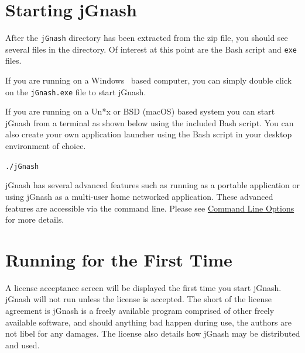 \documentclass[letterpaper,12pt]{book}
\begin{document}
    \section{Starting jGnash}\label{sec:starting-jgnash}

    After the \texttt{jGnash} directory has been extracted from the zip file, you should see several files in the directory.
    Of interest at this point are the Bash script and \texttt{exe} files.

    If you are running on a Windows\texttrademark~ based computer, you can simply double click on the \texttt{jGnash.exe} file to
    start jGnash.

    If you are running on a Un*x or BSD (macOS) based system you can start jGnash from a terminal as shown below using
    the included Bash script.
    You can also create your own application launcher using the Bash script in your desktop environment of choice.


    \begin{mdframed}[style=info]
        \texttt{./jGnash}
    \end{mdframed}

    jGnash has several advanced features such as running as a portable application or using jGnash as a multi-user home
    networked application. These advanced features are accessible via the command line.
    Please see \hyperref[ch:cmdOptions]{Command Line Options} for more details.

    \section{Running for the First Time}\label{sec:running-for-the-first-time}
    A license acceptance screen will be displayed the first time you start jGnash.
    jGnash will not run unless the license is accepted.
    The short of the license agreement is jGnash is a freely available program comprised of other freely available software,
    and should anything bad happen during use, the authors are not libel for any damages.
    The license also details how jGnash may be distributed and used.

\end{document}
